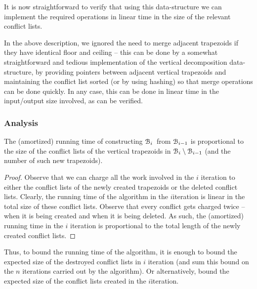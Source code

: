 It is now straightforward to verify that using this data-structure we
can implement the required operations in linear time in the size of
the relevant conflict lists.

In the above description, we ignored the need to merge adjacent
trapezoids if they have identical floor and ceiling -- this can be
done by a somewhat straightforward and tedious implementation of the
vertical decomposition data-structure, by providing pointers between
adjacent vertical trapezoids and maintaining the conflict list sorted
(or by using hashing) so that merge operations can be done quickly. In
any case, this can be done in linear time in the input/output size
involved, as can be verified.

\subsubsection{Analysis}

\begin{claim}
    The (amortized) running time of constructing $\EuScript{B}_i\,$ from
    $\EuScript{B}_{i-1}$ is proportional to the size of the conflict lists of
    the vertical trapezoids in $\EuScript{B}_i \setminus \EuScript{B}_{i-1}$ (and
    the number of such new trapezoids).
\end{claim}
\begin{proof}
    Observe that we can charge all the work involved in the $i$\th
    iteration to either the conflict lists of the newly created
    trapezoids or the deleted conflict lists. Clearly, the running
    time of the algorithm in the $i$\th iteration is linear in the
    total size of these conflict lists. Observe that every conflict
    gets charged twice -- when it is being created and when it is
    being deleted. As such, the (amortized) running time in the $i$\th
    iteration is proportional to the total length of the newly created
    conflict lists.
\end{proof}


Thus, to bound the running time of the algorithm, it is enough to
bound the expected size of the destroyed conflict lists in $i$\th
iteration (and sum this bound on the $n$ iterations carried out by the
algorithm). Or alternatively, bound the expected size of the conflict
lists created in the $i$\th iteration.


